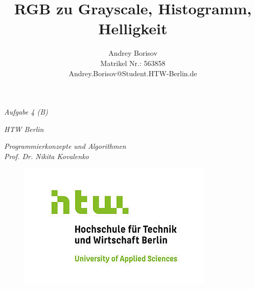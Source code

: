 \documentclass[11pt]{amsart}
\title{RGB zu Grayscale, Histogramm, Helligkeit}
\author{Andrey Borisov\\ Matrikel Nr.: 563858 \\ Andrey.Borisov@Student.HTW-Berlin.de}
\begin{document}
\begin{titlepage}
\pagebreak
\hspace{0pt}
\vfill

\begin{center}

\fontsize{14}{17}\selectfont
\textit{Aufgabe 4 (B)}\\
\maketitle


\normalsize
\vspace{0.3cm}



\vspace{2cm}





\vspace{0.3cm}

\textit{HTW Berlin}

\vspace{0.1cm}

\textit{Programmierkonzepte und Algorithmen} \\
\vspace{0.3cm}
\textit{Prof. Dr. Nikita Kovalenko}



\end{center}

\vfill
\hspace{0pt}


\begin{figure}[htb]
 \raggedleft
 \includegraphics[scale=0.4]{images/htwLogo.jpg}
\end{figure}
\vspace{-1cm}
\pagebreak
\end{titlepage}
\end{document}
